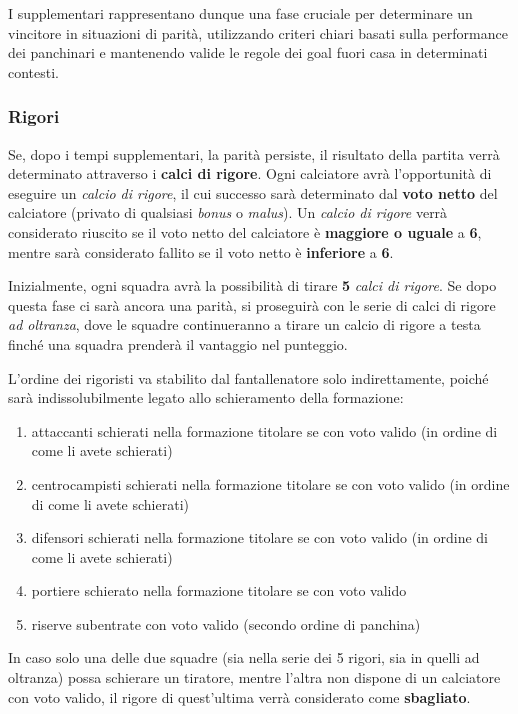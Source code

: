 \documentclass[12pt]{article}
\begin{document}
I supplementari rappresentano dunque una fase cruciale per determinare un vincitore in situazioni di parità, utilizzando criteri chiari basati sulla performance dei panchinari e mantenendo valide le regole dei goal fuori casa in determinati contesti.

\subsubsection{Rigori}

Se, dopo i tempi supplementari, la parità persiste, il risultato della partita verrà determinato attraverso i \textbf{calci di rigore}. Ogni calciatore avrà l'opportunità di eseguire un \textit{calcio di rigore}, il cui successo sarà determinato dal \textbf{voto netto} del calciatore (privato di qualsiasi \textit{bonus} o \textit{malus}). Un \textit{calcio di rigore} verrà considerato riuscito se il voto netto del calciatore è \textbf{maggiore o uguale} a \textbf{6}, mentre sarà considerato fallito se il voto netto è \textbf{inferiore} a \textbf{6}.

Inizialmente, ogni squadra avrà la possibilità di tirare \textbf{5} \textit{calci di rigore}. Se dopo questa fase ci sarà ancora una parità, si proseguirà con le serie di calci di rigore \textit{ad oltranza}, dove le squadre continueranno a tirare un calcio di rigore a testa finché una squadra prenderà il vantaggio nel punteggio.

L'ordine dei rigoristi va stabilito dal fantallenatore solo indirettamente, poiché sarà indissolubilmente legato allo schieramento della formazione:

\begin{enumerate}
    \item attaccanti schierati nella formazione titolare se con voto valido (in ordine di come li avete schierati)
    \item centrocampisti schierati nella formazione titolare se con voto valido (in ordine di come li avete schierati)
    \item difensori schierati nella formazione titolare se con voto valido (in ordine di come li avete schierati)
    \item portiere schierato nella formazione titolare se con voto valido
    \item riserve subentrate con voto valido (secondo ordine di panchina)
\end{enumerate}

In caso solo una delle due squadre (sia nella serie dei 5 rigori, sia in quelli ad oltranza) possa schierare un tiratore, mentre l'altra non dispone di un calciatore con voto valido, il rigore di quest'ultima verrà considerato come \textbf{sbagliato}.
\end{document}
